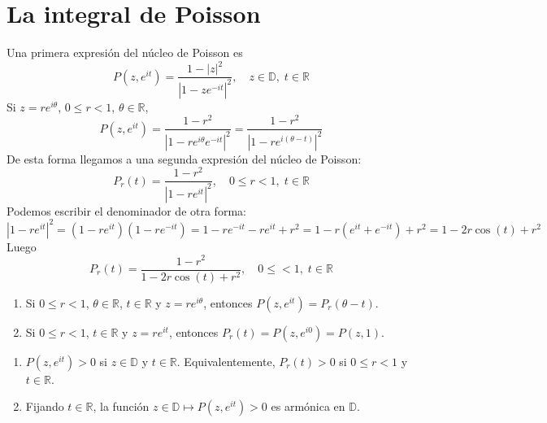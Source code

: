 \section{La integral de Poisson}
Una primera expresión del núcleo de Poisson es
$$P(z, e^{it}) = \frac{1-|z|^2}{|1-ze^{-it}|^2}, \quad z \in \mathbb{D}, \; t \in \mathbb{R}$$
Si $z = re^{i\theta}$, $0 \leq r < 1$, $\theta \in \mathbb{R}$,
$$P(z, e^{it}) = \frac{1-r^2}{|1-re^{i\theta}e^{-it}|^2} = \frac{1-r^2}{|1-re^{i(\theta-t)}|^2}$$
De esta forma llegamos a una segunda expresión del núcleo de Poisson:
$$P_r(t) = \frac{1-r^2}{|1-re^{it}|^2}, \quad 0 \leq r < 1, \; t \in \mathbb{R}$$
Podemos escribir el denominador de otra forma:
$$|1-re^{it}|^2 = (1-re^{it})(1-re^{-it}) = 1 - re^{-it} - re^{it} + r^2 = 1 - r(e^{it}+e^{-it}) + r^2 = 1 - 2r\cos(t) + r^2$$
Luego
$$P_r(t) = \frac{1-r^2}{1 - 2r\cos(t) + r^2}, \quad 0 \leq < 1, \; t \in \mathbb{R}$$

\begin{remark}
    \hfill
    \begin{enumerate}
        \item Si $0 \leq r < 1$, $\theta \in \mathbb{R}$, $t \in \mathbb{R}$ y $z = re^{i\theta}$, entonces $P(z, e^{it}) = P_r(\theta-t)$.
        \item Si $0 \leq r < 1$, $t \in \mathbb{R}$ y $z = re^{it}$, entonces $P_r(t) = P(z, e^{i0}) = P(z, 1)$.
    \end{enumerate}
\end{remark}

\begin{properties}
    \hfill
    \begin{enumerate}
        \item $P(z, e^{it}) > 0$ si $z \in \mathbb{D}$ y $t \in \mathbb{R}$.
              Equivalentemente, $P_r(t) > 0$ si $0 \leq r < 1$ y $t \in \mathbb{R}$.
        \item Fijando $t \in \mathbb{R}$, la función $z \in \mathbb{D} \mapsto P(z, e^{it}) > 0$ es armónica en $\mathbb{D}$.
    \end{enumerate}
\end{properties}